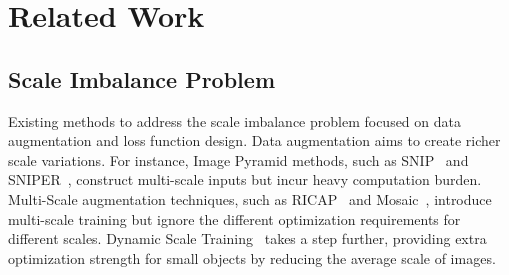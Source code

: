 \documentclass{article}
\begin{document}

\section{Related Work}
\label{section_2}


\subsection{Scale Imbalance Problem}


Existing methods to address the scale imbalance problem focused on data augmentation and loss function design. Data augmentation aims to create richer scale variations. For instance, Image Pyramid methods, such as SNIP~\cite{singh2018analysis} and SNIPER~\cite{singh2018sniper}, construct multi-scale inputs but incur heavy computation burden. 
Multi-Scale augmentation techniques, such as RICAP~\cite{takahashi2018ricap} and Mosaic~\cite{bochkovskiy2020yolov4}, introduce multi-scale training but ignore the different optimization requirements for different scales. Dynamic Scale Training~\cite{chen2020dynamic} takes a step further, providing extra optimization strength for small objects by reducing the average scale of images.

\end{document}
